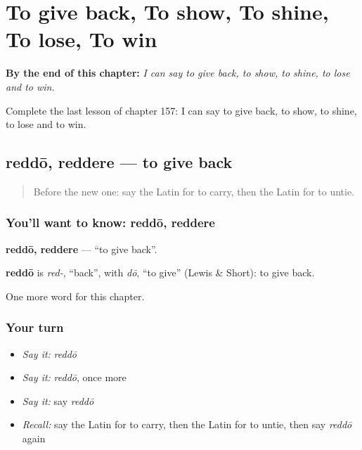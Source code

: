 
\chapter{To give back, To show, To shine, To lose, To win}
\label{ch:la-to-give-back-to-show-to-shine-to-lose-to-win}

\begin{chapteropening}
\textbf{By the end of this chapter:} \emph{I can say to give back, to show, to shine, to lose and to win.}

Complete the last lesson of chapter 157: I can say to give back, to show, to shine, to lose and to win.
\end{chapteropening}

\section[reddō, reddere]{reddō, reddere — to give back}

\label{lesson:LA-C157-reddo}



\begin{quote}
Before the new one: say the Latin for to carry, then the Latin for to untie.
\end{quote}

\subsection*{You'll want to know: reddō, reddere}
\textbf{reddō, reddere} — \textquotedblleft{}to give back\textquotedblright{}.

\begin{cousinweb}
\textbf{reddō} is \emph{red-}, \textquotedblleft{}back\textquotedblright{}, with \emph{dō}, \textquotedblleft{}to give\textquotedblright{} (Lewis \& Short): to give back.
\end{cousinweb}

\begin{grammarlens}[title={What you've built}]
One more word for this chapter.
\end{grammarlens}

\subsection*{Your turn}
\begin{itemize}
\raggedright
  \item \emph{Say it:} \emph{reddō}
  \item \emph{Say it:} \emph{reddō}, once more
  \item \emph{Say it:} say \emph{reddō}
  \item \emph{Recall:} say the Latin for to carry, then the Latin for to untie, then say \emph{reddō} again
\end{itemize}

